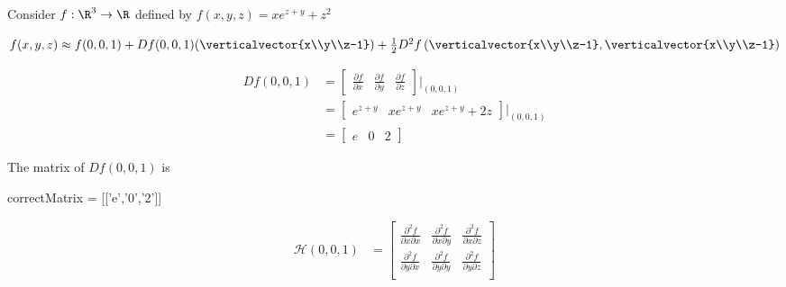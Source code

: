 \documentclass{ximera}
\begin{document}
	\begin{question}
		Consider $f:\R^3 \to \R$ defined by $f(x,y,z) = xe^{z+y} +z^2$
			\begin{solution}
				\begin{hint}
					$f(x,y,z) \approx f(0,0,1)+Df(0,0,1)(\verticalvector{x\\y\\z-1})+ \frac{1}{2}D^2f\left(\verticalvector{x\\y\\z-1},\verticalvector{x\\y\\z-1}\right)$
				\end{hint}
				\begin{hint}
					\begin{question}
						\begin{solution}
							\begin{hint}
								\begin{align*}
									Df(0,0,1) &= \begin{bmatrix} \frac{\partial f}{\partial x} & \frac{\partial f}{\partial y}& \frac{\partial f}{\partial z} \end{bmatrix} \big|_{(0,0,1)}\\
									&= \begin{bmatrix} e^{z+y} & xe^{z+y}& xe^{z+y}+2z \end{bmatrix} \big|_{(0,0,1)}\\
									&=\begin{bmatrix} e & 0 &2\end{bmatrix} 
								\end{align*}
							\end{hint}
						The matrix of $Df(0,0,1)$ is 
						\begin{matrix-answer}
							correctMatrix = [['e','0','2']]
						\end{matrix-answer}
						\end{solution}
						\begin{solution}
							\begin{hint}
								\begin{align*}
									\mathcal{H}(0,0,1) &= 
									\left.\begin{bmatrix}  
									\frac{\partial ^2f}{\partial x\partial x} & \frac{\partial ^2f}{\partial x\partial y}&\frac{\partial ^2f}{\partial x\partial z}\\
									\frac{\partial ^2f}{\partial y\partial x} & \frac{\partial ^2f}{\partial y\partial y}&\frac{\partial ^2f}{\partial y\partial z}\\

\end{bmatrix}
\end{align*}
\end{hint}
\end{solution}
\end{question}
\end{hint}
\end{solution}
\end{question}
\end{document}
